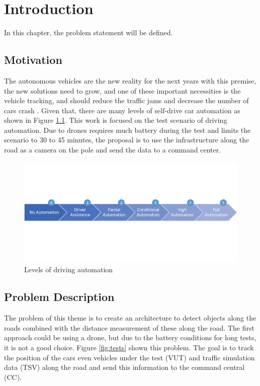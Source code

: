 \chapter{Introduction} \label{introducao}
In this chapter, the problem statement will be defined. 
\section{Motivation}

The autonomous vehicles are the new reality for the next years with this premise, the new solutions need to grow, and one of these important necessities is the vehicle tracking, and should reduce the traffic jams and decrease the number of cars crash \cite{bonnefon2016social}. Given that, there are many levels of self-drive car automation as shown in Figure \ref{fig:automation}. This work is focused on the test scenario of driving automation. Due to drones requires much battery during the test and limits the scenario to 30 to 45 minutes, the proposal is to use the infrastructure along the road as a camera on the pole and send the data to a command center.

\begin{figure}[H]
\centering
\includegraphics[scale=0.55]{imagens/diagrama_levels.png}
\caption{Levels of driving automation}
\label{fig:automation}
\end{figure}

\section{Problem Description}

The problem of this theme is to create an architecture to detect objects along the roads combined with the distance measurement of these along the road. The first approach could be using a drone, but due to the battery conditions for long tests, it is not a good choice. Figure \ref{fig:tests} shown this problem. The goal is to track the position of the cars even vehicles under the test (VUT) and traffic simulation data (TSV) along the road and send this information to the command central (CC). 

